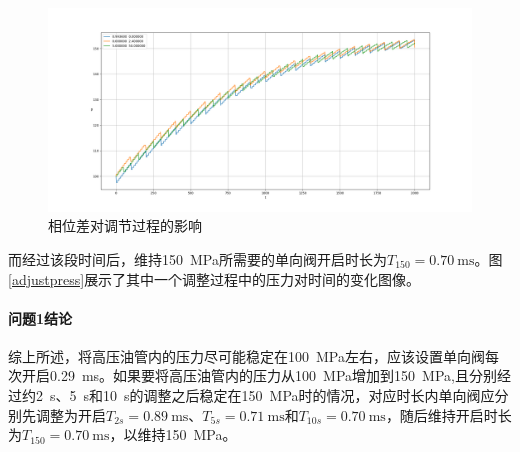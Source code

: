 \documentclass[12pt,AutoFakeBold]{article}%
\begin{document}
    \begin{figure}[H]
        \centering
        \includegraphics[scale = 0.32]{figure/12-1-exxwc.png}
        \caption{相位差对调节过程的影响}
        \label{12exxwc}
    \end{figure}
    而经过该段时间后，维持\SI{150}{\MPa}所需要的单向阀开启时长为$T_{150}=\SI{0.70}{\ms}$。图\ref{adjustpress}展示了其中一个调整过程中的压力对时间的变化图像。\par
    \paragraph{问题1结论}
    综上所述，将高压油管内的压力尽可能稳定在\SI{100}{\MPa}左右，应该设置单向阀每次开启\SI{0.29}{\ms}。如果要将高压油管内的压力从\SI{100}{\MPa}增加到\SI{150}{\MPa},且分别经过约\SI{2}{\s}、\SI{5}{\s}和\SI{10}{\s}的调整之后稳定在\SI{150}{\MPa}时的情况，对应时长内单向阀应分别先调整为开启$T_{2s}=\SI{0.89}{\ms}$、$T_{5s}=\SI{0.71}{\ms}$和$T_{10s}=\SI{0.70}{\ms}$，随后维持开启时长为$T_{150}=\SI{0.70}{\ms}$，以维持\SI{150}{\MPa}。\par
    
\end{document}

